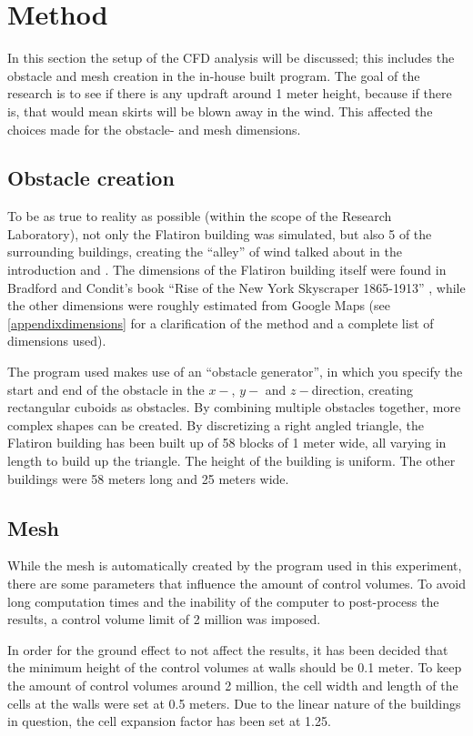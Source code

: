 \section{Method}
\label{method}
In this section the setup of the CFD analysis will be discussed; this includes the obstacle and mesh creation in the in-house built program. The goal of the research is to see if there is any updraft around 1 meter height, because if there is, that would mean skirts will be blown away in the wind. This affected the choices made for the obstacle- and mesh dimensions.
\subsection{Obstacle creation}
\label{obstacles}
To be as true to reality as possible (within the scope of the Research Laboratory), not only the Flatiron building was simulated, but also 5 of the surrounding buildings, creating the ``alley'' of wind talked about in the introduction and \cite{dresses}. The dimensions of the Flatiron building itself were found in Bradford and Condit's book ``Rise of the New York Skyscraper 1865-1913'' \cite{skyscraper}, while the other dimensions were roughly estimated from Google Maps (see \autoref{appendixdimensions} for a clarification of the method and a complete list of dimensions used). 

The program used makes use of an ``obstacle generator'', in which you specify the start and end of the obstacle in the $x-$, $y-$ and $z-$direction, creating rectangular cuboids as obstacles. By combining multiple obstacles together, more complex shapes can be created. By discretizing a right angled triangle, the Flatiron building has been built up of 58 blocks of 1 meter wide, all varying in length to build up the triangle. The height of the building is uniform. The other buildings were 58 meters long and 25 meters wide.

\subsection{Mesh}
\label{sec:mesh}
While the mesh is automatically created by the program used in this experiment, there are some parameters that influence the amount of control volumes. To avoid long computation times and the inability of the computer to post-process the results, a control volume limit of 2 million was imposed.

In order for the ground effect to not affect the results, it has been decided that the minimum height of the control volumes at walls should be 0.1 meter. To keep the amount of control volumes around 2 million, the cell width and length of the cells at the walls were set at 0.5 meters. Due to the linear nature of the buildings in question, the cell expansion factor has been set at 1.25.


